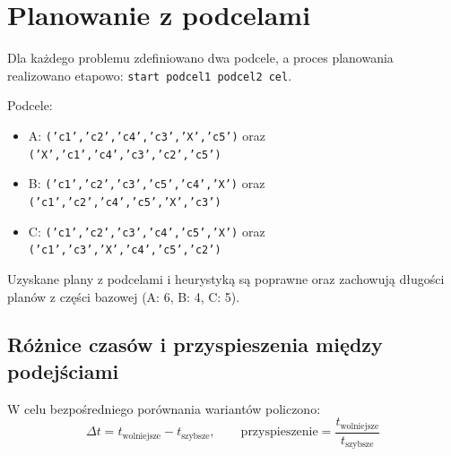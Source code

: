 \documentclass[12pt,a4paper]{article}
\begin{document}
\section{Planowanie z podcelami}
Dla każdego problemu zdefiniowano dwa podcele, a proces planowania realizowano etapowo:
\texttt{start \textrightarrow{} podcel1 \textrightarrow{} podcel2 \textrightarrow{} cel}.

Podcele:
\begin{itemize}
    \item A: \texttt{('c1','c2','c4','c3','X','c5')} oraz \texttt{('X','c1','c4','c3','c2','c5')}
    \item B: \texttt{('c1','c2','c3','c5','c4','X')} oraz \texttt{('c1','c2','c4','c5','X','c3')}
    \item C: \texttt{('c1','c2','c3','c4','c5','X')} oraz \texttt{('c1','c3','X','c4','c5','c2')}
\end{itemize}

\begin{table}[h]
\centering
{}
\caption{Wyniki dla planowania z podcelami (z i bez heurystyki).}
\end{table}

Uzyskane plany z podcelami i heurystyką są poprawne oraz zachowują długości planów z części bazowej (A: 6, B: 4, C: 5).

\subsection{Różnice czasów i przyspieszenia między podejściami}
W celu bezpośredniego porównania wariantów policzono:
\[
\Delta t = t_{\text{wolniejsze}} - t_{\text{szybsze}}, \qquad
\text{przyspieszenie} = \frac{t_{\text{wolniejsze}}}{t_{\text{szybsze}}}
\]
\end{document}
